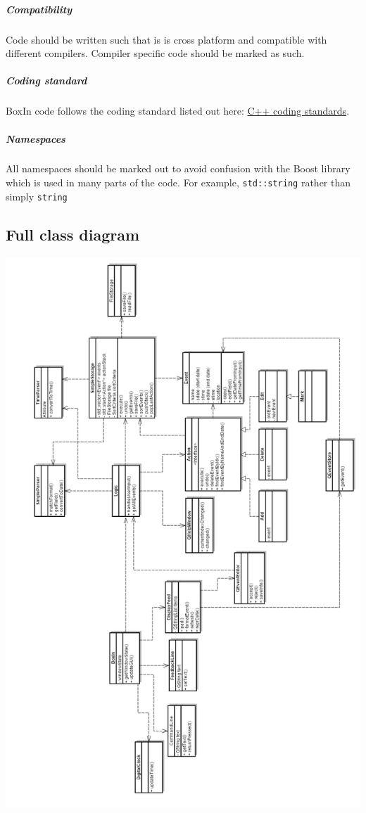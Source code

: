 \documentclass[12pt]{extarticle}
\begin{document}
\subparagraph{Compatibility}
Code should be written such that is is cross platform and compatible with different compilers. Compiler specific code should be marked as such.

\subparagraph{Coding standard}
BoxIn code follows the coding standard listed out here: \href{https://docs.google.com/document/pub?id=1tJD2XQo3hUb0SZniswLqg0vkmccv7vGBV7\_1AhTYK04\&amp\&embedded=true}{C++ coding standards}.

\subparagraph{Namespaces}
All namespaces should be marked out to avoid confusion with the Boost library which is used in many parts of the code. For example, \texttt{std::string} rather than simply \texttt{string}

\subsection{Full class diagram}
\includegraphics[width=\textwidth]{class_diagram}
\end{document}
